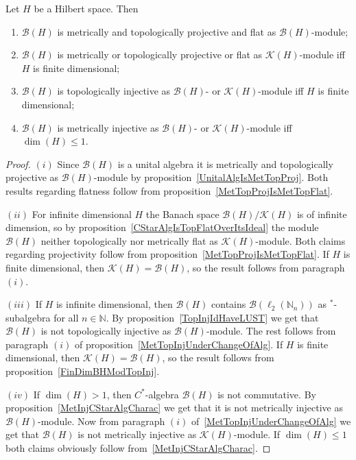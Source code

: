 \begin{proposition}\label{KHAndBHModBH} Let $H$ be a Hilbert space. Then

\begin{enumerate}[label = (\roman*)]
    \item $\mathcal{B}(H)$ is metrically and topologically projective and 
    flat as $\mathcal{B}(H)$-module;

    \item $\mathcal{B}(H)$ is metrically or topologically projective or flat as
    $\mathcal{K}(H)$-module iff $H$ is finite dimensional;

    \item $\mathcal{B}(H)$ is topologically injective as $\mathcal{B}(H)$- or
    $\mathcal{K}(H)$-module iff $H$ is finite dimensional;

    \item $\mathcal{B}(H)$ is metrically injective as $\mathcal{B}(H)$- or
    $\mathcal{K}(H)$-module iff $\dim(H)\leq 1$.
\end{enumerate}
\end{proposition}
\begin{proof} $(i)$ Since $\mathcal{B}(H)$ is a unital algebra it is metrically
and topologically projective as $\mathcal{B}(H)$-module by
proposition~\ref{UnitalAlgIsMetTopProj}. Both results regarding flatness follow
from proposition~\ref{MetTopProjIsMetTopFlat}.

$(ii)$ For infinite dimensional $H$ the Banach space
$\mathcal{B}(H)/\mathcal{K}(H)$ is of infinite dimension, so by
proposition~\ref{CStarAlgIsTopFlatOverItsIdeal} the module $\mathcal{B}(H)$
neither topologically nor metrically flat as $\mathcal{K}(H)$-module. Both
claims regarding projectivity follow from
proposition~\ref{MetTopProjIsMetTopFlat}. If $H$ is finite dimensional, then
$\mathcal{K}(H)=\mathcal{B}(H)$, so the result follows from paragraph $(i)$.

$(iii)$ If $H$ is infinite dimensional, then $\mathcal{B}(H)$ contains
$\mathcal{B}(\ell_2(\mathbb{N}_n))$ as ${}^*$-subalgebra for all
$n\in\mathbb{N}$. By proposition~\ref{TopInjIdHaveLUST} we get that
$\mathcal{B}(H)$ is not topologically injective as $\mathcal{B}(H)$-module. The
rest follows from paragraph $(i)$ of proposition~\ref{MetTopInjUnderChangeOfAlg}.
If $H$ is finite dimensional, then $\mathcal{K}(H)=\mathcal{B}(H)$, so the
result follows from proposition~\ref{FinDimBHModTopInj}.

$(iv)$ If $\dim(H)>1$, then $C^*$-algebra $\mathcal{B}(H)$ is not commutative. 
By proposition~\ref{MetInjCStarAlgCharac} we get that it is not metrically
injective as $\mathcal{B}(H)$-module. Now from paragraph $(i)$
of~\ref{MetTopInjUnderChangeOfAlg} we get that $\mathcal{B}(H)$ is not
metrically injective as $\mathcal{K}(H)$-module. If $\dim(H)\leq 1$ both claims
obviously follow from~\ref{MetInjCStarAlgCharac}.
\end{proof}

